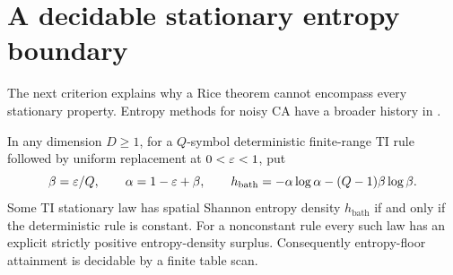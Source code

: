 \section{A decidable stationary entropy boundary}\label{sec:entropy}
The next criterion explains why a Rice theorem cannot encompass every stationary property. Entropy methods for noisy CA have a broader history in \cite{MST19,marcovici-taati}.

\begin{theorem}\label{thm:entropy-classical}
In any dimension $D\ge1$, for a $Q$-symbol deterministic finite-range TI rule followed by uniform replacement at $0<\varepsilon<1$, put
\begin{equation}\label{eq:bath-entropy}
 \beta=\varepsilon/Q,\qquad \alpha=1-\varepsilon+\beta,\qquad
 h_{\mathrm{bath}}=-\alpha\log\alpha-(Q-1)\beta\log\beta.
\end{equation}
Some TI stationary law has spatial Shannon entropy density $h_{\mathrm{bath}}$ if and only if the deterministic rule is constant. For a nonconstant rule every such law has an explicit strictly positive entropy-density surplus. Consequently entropy-floor attainment is decidable by a finite table scan.
\end{theorem}
